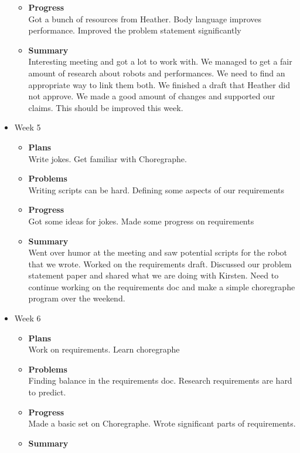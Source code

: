 \begin{itemize}
\begin{itemize}
				\item \textbf{Progress} \\
				Got a bunch of resources from Heather. Body language improves performance. Improved the problem statement significantly
				\item \textbf{Summary} \\
				Interesting meeting and got a lot to work with. We managed to get a fair amount of research about robots and performances. We need to find an appropriate way to link them both. 
				We finished a draft that Heather did not approve. We made a good amount of changes and supported our claims. This should be improved this week.
			\end{itemize}
		\item{Week 5}
			\begin{itemize}
				\item \textbf{Plans} \\
				Write jokes. Get familiar with Choregraphe.
				\item \textbf{Problems} \\
				Writing scripts can be hard. Defining some aspects of our requirements
				\item \textbf{Progress} \\
				Got some ideas for jokes. Made some progress on requirements
				\item \textbf{Summary} \\
				Went over humor at the meeting and saw potential scripts for the robot that we wrote. Worked on the requirements draft. Discussed our problem statement paper and shared what we are doing with Kirsten. Need to continue working on the requirements doc and make a simple choregraphe program over the weekend. 
			\end{itemize}
		\item{Week 6}
			\begin{itemize}
				\item \textbf{Plans} \\
				Work on requirements. Learn choregraphe
				\item \textbf{Problems} \\
				Finding balance in the requirements doc. Research requirements are hard to predict.
				\item \textbf{Progress} \\
				Made a basic set on Choregraphe.
				Wrote significant parts of requirements.
				\item \textbf{Summary} \\

\end{itemize}
\end{itemize}
